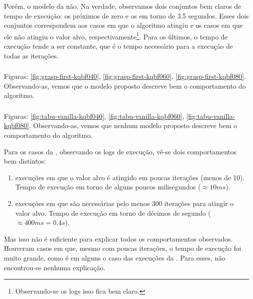 Porém, o modelo da  não. Na verdade, observamos dois conjuntos bem claros de tempo de execução: os próximos de zero e os em torno de 3.5 segundos. Esses dois conjuntos correspondem aos casos em que o algoritmo atingiu e os casos em que ele não atingiu o valor alvo, respectivamente\footnote{Observando-se os logs isso fica bem claro.}. Para os últimos, o tempo de execução tende a ser constante, que é o tempo necessário para a execução de todas as iterações.

\subsubsection{\graspFirst}
\label{subsubsection:ttt-validation-grasp-first}

Figuras: \ref{fig:grasp-first-kqbf040}, \ref{fig:grasp-first-kqbf060},
\ref{fig:grasp-first-kqbf080}. Observando-as, vemos que o modelo proposto descreve bem o comportamento do algoritmo.

\subsubsection{\tabuVanilla}
\label{subsubsection:ttt-validation-tabu-vanilla}

Figuras: \ref{fig:tabu-vanilla-kqbf040}, \ref{fig:tabu-vanilla-kqbf060},
\ref{fig:tabu-vanilla-kqbf080}. Observando-as, vemos que nenhum modelo proposto descreve bem o comportamento do algoritmo.

Para os casos da , observando os logs de execução, vê-se dois comportamentos bem distintos:

\begin{enumerate}
    \item execuções em que o valor alvo é atingido em poucas iterações (menos de 10). Tempo de execução em torno de alguns poucos milisegundos ($\approx 10 ms$).
    \item execuções em que são necessárias pelo menos 300 iterações para atingir o valor alvo. Tempo de execução em torno de décimos de segundo ($\approx 400 ms = 0.4 s$).
\end{enumerate}

Mas isso não é suficiente para explicar todos os comportamentos observados. Houveram casos em que, mesmo com poucas iterações, o tempo de execução foi muito grande, como é em alguns o caso das execuções da . Para esses, não encontrou-se nenhuma explicação.

